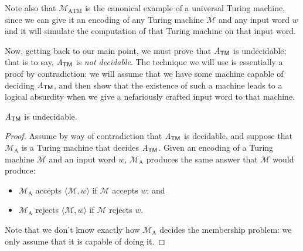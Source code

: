 Note also that $\mathcal{M}_{\mathrm{ATM}}$ is the canonical example of a universal Turing machine, since we can give it an encoding of any Turing machine $\mathcal{M}$ and any input word $w$ and it will simulate the computation of that Turing machine on that input word.

Now, getting back to our main point, we must prove that $\mathit{A}_{\textsf{TM}}$ is undecidable; that is to say, $\mathit{A}_{\textsf{TM}}$ is \emph{not decidable}. The technique we will use is essentially a proof by contradiction: we will assume that we have some machine capable of deciding $\mathit{A}_{\textsf{TM}}$, and then show that the existence of such a machine leads to a logical absurdity when we give a nefariously crafted input word to that machine.

\begin{theorem}\label{thm:ATMundecidable}
$\mathit{A}_{\textsf{TM}}$ is undecidable.

\begin{proof}
Assume by way of contradiction that $\mathit{A}_{\textsf{TM}}$ is decidable, and suppose that $\mathcal{M}_{\mathrm{A}}$ is a Turing machine that decides $\mathit{A}_{\textsf{TM}}$. Given an encoding of a Turing machine $\mathcal{M}$ and an input word $w$, $\mathcal{M}_{\mathrm{A}}$ produces the same answer that $\mathcal{M}$ would produce:
\begin{itemize}
\item $\mathcal{M}_{\mathrm{A}}$ accepts $\langle \mathcal{M}, w \rangle$ if $\mathcal{M}$ accepts $w$; and
\item $\mathcal{M}_{\mathrm{A}}$ rejects $\langle \mathcal{M}, w \rangle$ if $\mathcal{M}$ rejects $w$.
\end{itemize}
Note that we don't know exactly how $\mathcal{M}_{\mathrm{A}}$ decides the membership problem: we only assume that it is capable of doing it.


\end{proof}
\end{theorem}
